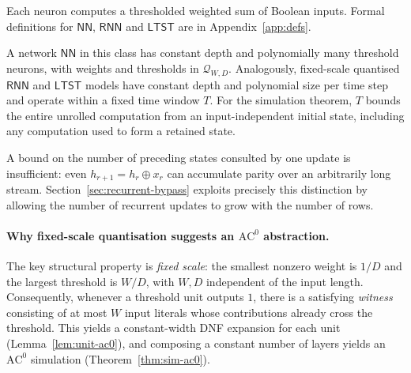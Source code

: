 \documentclass[twoside,11pt]{article}
\newcommand{\AC}{\mathrm{AC}}
\newcommand{\NN}{\mathsf{NN}}
\newcommand{\RNN}{\mathsf{RNN}}
\newcommand{\LTST}{\mathsf{LTST}}
\newcommand{\Qset}{\mathcal{Q}}
\numberwithin{theorem}{section}
\numberwithin{equation}{section}
\begin{document}
Each neuron computes a thresholded weighted sum of Boolean inputs. Formal definitions for $\NN$, $\RNN$ and $\LTST$ are in Appendix~\ref{app:defs}.

\begin{definition}
\label{def:quantised-inference}
A network $\NN$ in this class has constant depth and polynomially many threshold neurons, with weights and thresholds in $\Qset_{W,D}$.
Analogously, fixed-scale quantised $\RNN$ and $\LTST$ models have constant depth and polynomial size per time step and operate within a fixed time window $T$.
For the simulation theorem, $T$ bounds the entire unrolled computation from an input-independent initial state, including any computation used to form a retained state.
\end{definition}

A bound on the number of preceding states consulted by one update is insufficient: even $h_{r+1}=h_r\oplus x_r$ can accumulate parity over an arbitrarily long stream. Section~\ref{sec:recurrent-bypass} exploits precisely this distinction by allowing the number of recurrent updates to grow with the number of rows.

\paragraph{Why fixed-scale quantisation suggests an $\AC^0$ abstraction.}
The key structural property is \emph{fixed scale}: the smallest nonzero weight is $1/D$ and the largest threshold is $W/D$, with $W,D$ independent of the input length.
Consequently, whenever a threshold unit outputs $1$, there is a satisfying \emph{witness} consisting of at most $W$ input literals whose contributions already cross the threshold.
This yields a constant-width DNF expansion for each unit (Lemma~\ref{lem:unit-ac0}), and composing a constant number of layers yields an $\AC^0$ simulation (Theorem~\ref{thm:sim-ac0}).
\end{document}
